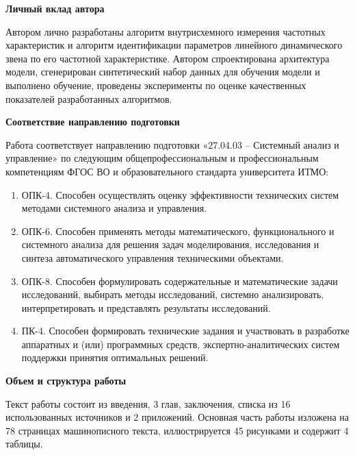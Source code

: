 \textbf{Личный вклад автора}\par
Автором лично разработаны алгоритм внутрисхемного измерения частотных характеристик и алгоритм идентификации параметров линейного динамического звена по его частотной характеристике. Автором спроектирована архитектура модели, сгенерирован синтетический набор данных для обучения модели и выполнено обучение, проведены эксперименты по оценке качественных показателей разработанных алгоритмов.

\textbf{Соответствие направлению подготовки}\par
Работа соответствует направлению подготовки «27.04.03 -- Системный анализ и управление» по следующим общепрофессиональным и профессиональным компетенциям ФГОС ВО и образовательного стандарта университета ИТМО:
\begin{enumerate}
    \item ОПК-4. Способен осуществлять оценку эффективности технических систем методами системного анализа и управления.
    \item ОПК-6. Способен применять методы математического, функционального и системного анализа для решения задач моделирования, исследования и синтеза автоматического управления техническими объектами.
    \item ОПК-8. Способен формулировать содержательные и математические задачи исследований, выбирать методы исследований, системно анализировать, интерпретировать и представлять результаты исследований.
    \item ПК-4. Способен формировать технические задания и участвовать в разработке аппаратных и (или) программных средств, экспертно-аналитических систем поддержки принятия оптимальных решений.
\end{enumerate}

\textbf{Объем и структура работы}\par
Текст работы состоит из введения, 3 глав, заключения, списка из 16 использованных источников и 2 приложений. Основная часть работы изложена на 78 страницах машинописного текста, иллюстрируется 45 рисунками и содержит 4 таблицы.